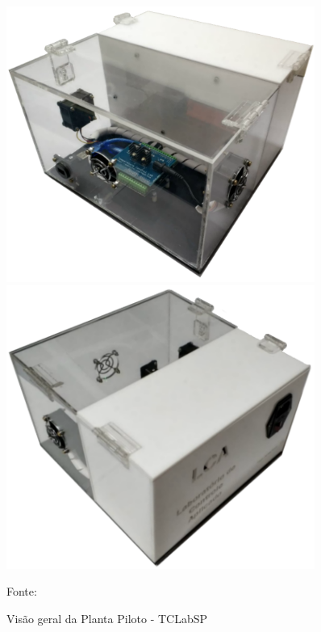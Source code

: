 \begin{figure}[h]
    \centering
	\caption{Visão geral da Planta Piloto - TCLabSP}
    \begin{minipage}{0.47\textwidth}
        \centering
        \includegraphics[width=0.9\textwidth]{./5_images/TCLabSP_1.png} 
    \end{minipage}\hfill
    \begin{minipage}{0.47\textwidth}
        \centering
        \includegraphics[width=0.9\textwidth]{./5_images/TCLabSP_2.png} 
	\end{minipage}
	\label{fig:tclabsp}		      
	Fonte: 
\end{figure}

